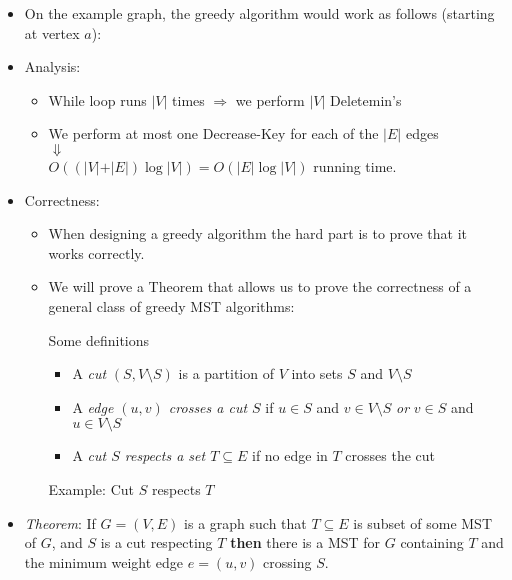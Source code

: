 \documentclass[11pt]{article}
\begin{document}
\begin{itemize}
\item On the example graph, the greedy algorithm would work as follows
	(starting at vertex $a$): \\
  
  \centerline{}
  \centerline{}
  

\item Analysis: 
  \begin{itemize}
  \item While loop runs $\vert V \vert$ times $\Rightarrow$ we
    perform $\vert V \vert$ {\sc Deletemin}'s
  \item We perform at most one {\sc Decrease-Key} for each of the $\vert E
    \vert$ edges \\
    $\Downarrow$ \\
    $O((\vert V \vert + \vert E \vert) \log \vert V \vert)=O(\vert E
    \vert \log \vert V \vert)$ running time.
  \end{itemize}
\item Correctness: 
  \begin{itemize}
  \item When designing a greedy algorithm the hard part is to
    prove that it works correctly.
  \item We will prove a Theorem that allows us to prove the
    correctness of a general class of greedy MST algorithms:
    
    Some definitions
    \begin{itemize}
    \item A {\em cut} $(S, V \setminus S)$ is a partition
      of $V$ into sets $S$ and $V\setminus S$
    \item A {\em edge $(u,v)$ crosses a cut $S$} if $u
      \in S$ and $v \in V\setminus S$ {\em or} $v \in S$ and $u
      \in V\setminus S$
    \item A {\em cut $S$ respects a set $T \subseteq E$}
      if no edge in $T$ crosses the cut
    \end{itemize}
    
    Example: Cut $S$ respects $T$ \\
    \centerline{}
  \end{itemize}
\item {\em Theorem}: If $G=(V,E)$ is a graph such that $T \subseteq
  E$ is subset of some MST of $G$, and $S$ is a cut respecting $T$ {\bf
    then} there is a MST for $G$ containing $T$ and the minimum weight edge
  $e=(u,v)$ crossing $S$.
  

\end{itemize}
\end{document}
